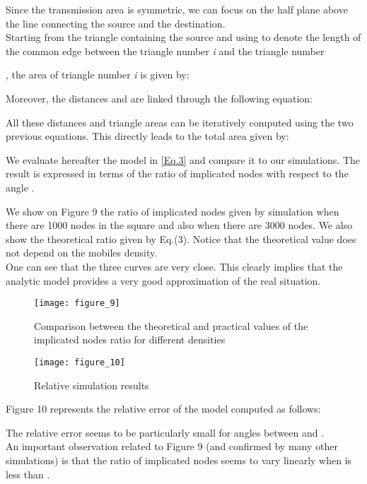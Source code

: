 \documentclass{IEEEtran}
\begin{document}
Since the transmission area is symmetric, we can focus on the half
plane above the line connecting the source and the destination.\\
Starting from the triangle containing the source and using 
to denote the length of the common edge between the triangle number
\emph{i} and the triangle number
    
, the area of triangle number \emph{i} is given by:


Moreover, the distances  and  are linked through the
following equation:


All these distances and triangle areas can be iteratively computed
using the two previous equations. This directly leads to the total
area given by:


We evaluate hereafter the model in \eqref{Eq.3} and compare it to
our simulations. The result is expressed in terms of the ratio of
implicated nodes with respect to the angle .

We show on Figure 9 the ratio of implicated nodes given by
simulation when there are 1000 nodes in the square and also when
there are 3000 nodes. We also show the theoretical ratio given by
Eq.(3). Notice that the theoretical value does not depend on the
mobiles density.
\\
One can see that the three curves are very close. This clearly
implies that the analytic model provides a very good approximation
of the real situation.

\begin{figure}[!htbp]
  \begin{center}
\texttt{[image: figure\_9]}
  \end{center}
  \caption{Comparison between the theoretical and practical values of the implicated nodes ratio for different densities}
\end{figure}

\begin{figure}[!htbp]
  \begin{center}
\texttt{[image: figure\_10]}
  \end{center}
  \caption{Relative simulation results}
\end{figure}

Figure 10 represents the relative error of the model computed as
follows:


The relative error seems to be particularly small for angles between
 and .\\
An important observation related to Figure 9 (and confirmed by many
other simulations) is that the ratio of implicated nodes seems to
vary linearly when  is less than .
\end{document}
